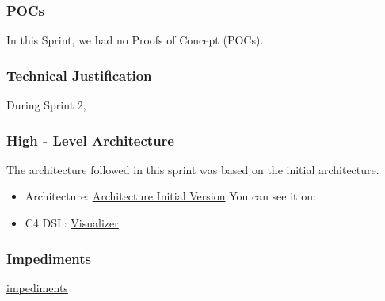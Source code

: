 \subsubsection{POCs}

In this Sprint, we had no Proofs of Concept (POCs).

\subsubsection{Technical Justification}

During Sprint 2, 

\subsubsection{High - Level Architecture}

The architecture followed in this sprint was based on the initial architecture.

\begin{itemize}
    \item Architecture: \href{https://github.com/Pending-Name-21/arquitecture/pull/1/files}{Architecture Initial Version}
    You can see it on: 
    \item C4 DSL: \href{https://structurizr.com/dsl}{Visualizer}
\end{itemize}

\subsubsection{Impediments}
\href{https://docs.google.com/spreadsheets/d/1ty_hOe11I5BHMMoJYUfMxHD2sC9OoST2Nor8Q2Cqvq0/edit?usp=sharing}{impediments}




